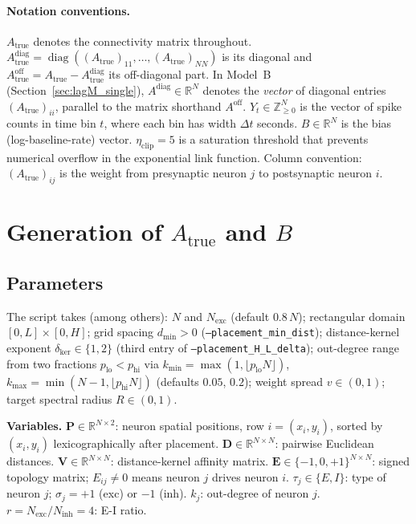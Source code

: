 \documentclass[11pt]{article}
\begin{document}
\paragraph{Notation conventions.}
$A_{\text{true}}$ denotes the connectivity matrix throughout.\\
$A_{\text{true}}^{\mathrm{diag}}=\operatorname{diag}
((A_{\text{true}})_{11},\dots,(A_{\text{true}})_{NN})$ is its diagonal
and $A_{\text{true}}^{\mathrm{off}}=A_{\text{true}}-
A_{\text{true}}^{\mathrm{diag}}$ its off-diagonal part.
In Model~B (Section~\ref{sec:lagM_single}), $A^{\mathrm{diag}}\in\mathbb{R}^N$
denotes the \emph{vector} of diagonal entries $(A_{\text{true}})_{ii}$,
parallel to the matrix shorthand $A^{\mathrm{off}}$.
$Y_t\in\mathbb{Z}_{\geq 0}^{N}$ is the vector of spike counts in
time bin $t$, where each bin has width $\Delta t$ seconds.
$B\in\mathbb{R}^{N}$ is the bias (log-baseline-rate) vector.
$\eta_{\mathrm{clip}}=5$ is a saturation threshold that prevents
numerical overflow in the exponential link function.
Column convention: $({A_{\text{true}}})_{ij}$ is the weight from
presynaptic neuron $j$ to postsynaptic neuron $i$.


\section{Generation of $A_{\text{true}}$ and $B$}
\label{sec:generation_AB}

\subsection{Parameters}

The script takes (among others): $N$ and $N_{\text{exc}}$ (default
$0.8\,N$); rectangular domain $[0,L]\times[0,H]$; grid spacing
$d_{\text{min}}>0$ (\texttt{--placement\_min\_dist}); distance-kernel
exponent $\delta_{\mathrm{ker}}\in\{1,2\}$ (third entry of
\texttt{--placement\_H\_L\_delta}); out-degree range from two fractions
$p_{\text{lo}}<p_{\text{hi}}$ via
$k_{\text{min}}=\max(1,\lfloor p_{\text{lo}}N\rfloor)$,
$k_{\text{max}}=\min(N-1,\lfloor p_{\text{hi}}N\rfloor)$ (defaults
$0.05$, $0.2$); weight spread $v\in(0,1)$; target spectral radius
$R\in(0,1)$.

\medskip\noindent
\textbf{Variables.}
$\mathbf{P}\in\mathbb{R}^{N\times 2}$: neuron spatial positions, row
$i=(x_i,y_i)$, sorted by $(x_i,y_i)$ lexicographically after placement.
$\mathbf{D}\in\mathbb{R}^{N\times N}$: pairwise Euclidean distances.
$\mathbf{V}\in\mathbb{R}^{N\times N}$: distance-kernel affinity matrix.
$\mathbf{E}\in\{-1,0,+1\}^{N\times N}$: signed topology matrix;
$E_{ij}\neq 0$ means neuron $j$ drives neuron $i$.
$\tau_j\in\{E,I\}$: type of neuron $j$;
$\sigma_j=+1$ (exc) or $-1$ (inh).
$k_j$: out-degree of neuron $j$.
$r=N_{\text{exc}}/N_{\text{inh}}=4$: E-I ratio.
\end{document}
